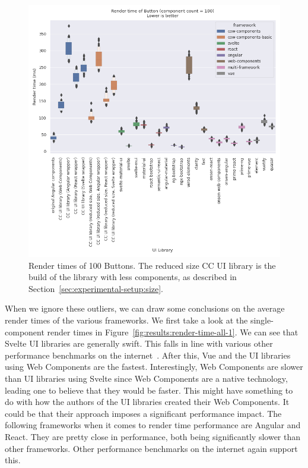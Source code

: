 \begin{figure}[h]
  \includegraphics[width=\columnwidth]{plots/render-time-all-100-Button.png}
  \caption{Render times of 100 Buttons. The reduced size CC UI library is the build of the library with less components, as described in Section~\ref{sec:experimental-setup:size}.}
  \label{fig:results:render-time-all-100}
  \centering
\end{figure}

When we ignore these outliers, we can draw some conclusions on the average render times of the various frameworks. We first take a look at the single-component render times in Figure~\ref{fig:results:render-time-all-1}. We can see that Svelte UI libraries are generally swift. This falls in line with various other performance benchmarks on the internet~. After this, Vue and the UI libraries using Web Components are the fastest. Interestingly, Web Components are slower than UI libraries using Svelte since Web Components are a native technology, leading one to believe that they would be faster. This might have something to do with how the authors of the UI libraries created their Web Components. It could be that their approach imposes a significant performance impact. The following frameworks when it comes to render time performance are Angular and React. They are pretty close in performance, both being significantly slower than other frameworks. Other performance benchmarks on the internet again support this.

